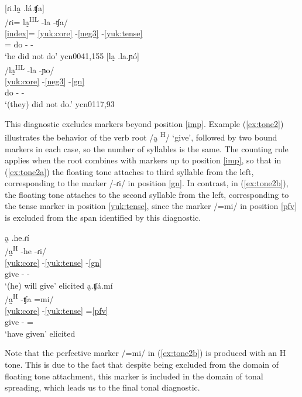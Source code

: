 \documentclass[output=paper]{langscibook}
\begin{document}
\ea \label{ex:tone1}
\ea \label{ex:tonea}
[ɾi.la̰ .lá.ʧa]   \\
    \glll /ɾi= la̰\textsuperscript{HL} -la -ʧa/ \\
         \ref{index}= \ref{yuk:core} -\ref{neg3} -\ref{yuk:tense}\\
       \Tsg{}= do -\Neg{} -\Pst{}\\
    \glt `he did not do' \hfill ycn0041,155
\ex \label{ex:toneb}
[la̰ .la.ɲó]   \\
  \glll /la̰\textsuperscript{HL} -la -ɲo/  \\
         \ref{yuk:core} -\ref{neg3} -\ref{gn}  \\
       do -\Neg{} -\Pl{}\\
    \glt `(they) did not do.' \hfill ycn0117,93
 \z
\z

This diagnostic excludes markers beyond position \ref{imp}. Example (\ref{ex:tone2}) illustrates the behavior of the verb root /a̰ \textsuperscript{H}/ `give', followed by two bound markers in each case, so the number of syllables is the same. The counting rule applies when the root combines with markers up to position \ref{imp}, so that in (\ref{ex:tone2a}) the floating tone attaches to third syllable from the left, corresponding to the marker /-ɾi/ \M{} in position \ref{gn}. In contrast, in (\ref{ex:tone2b}), the floating tone attaches to the second syllable from the left, corresponding to the tense marker in position \ref{yuk:tense}, since the marker /=mi/ \Pfv{} in position \ref{pfv} is excluded from the span identified by this diagnostic. 

\ea \label{ex:tone2}
\ea \label{ex:tone2a}
a̰ .he.ɾí   \\
    \glll /a̰\textsuperscript{H} -he -ɾi/ \\
         \ref{yuk:core} -\ref{yuk:tense} -\ref{gn}\\
       give -\Fut{} -\M{}\\
    \glt `(he) will give' \hfill elicited
\ex \label{ex:tone2b}
a̰.ʧá.mí   \\
  \glll  /a̰\textsuperscript{H} -ʧa =mi/ \\
         \ref{yuk:core} -\ref{yuk:tense} =\ref{pfv}  \\
       give -\Pst{} =\Pfv{}\\
    \glt `have given' \hfill elicited
 \z
 \z
 
Note that the perfective marker /=mi/ in (\ref{ex:tone2b}) is produced with an H tone. This is due to the fact that despite being excluded from the domain of floating tone attachment, this marker is included in the domain of tonal spreading, which leads us to the final tonal diagnostic. 
\end{document}

